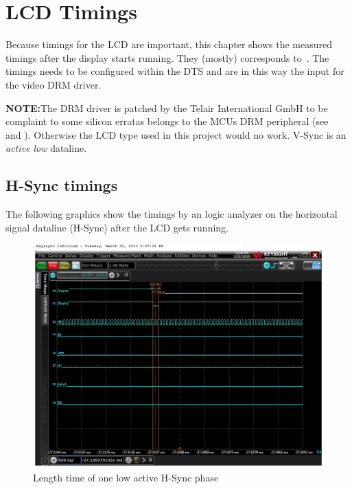 \chapter{LCD Timings}%
\label{cha:lcd_timings}

Because timings for the LCD are important, this chapter shows the measured
timings after the display starts running. They (mostly) corresponds to~\cite[LCD
data sheet]{ortustechlcd}. The timings needs to be configured within
the \gls{DTS} and are in this way the input for the video \gls{DRM} driver.

\textbf{NOTE:}\@ The DRM driver is patched by the Telair International GmbH to
be complaint to some silicon erratas belongs to the MCUs DRM peripheral
(see~\cite{TI_am335x_errata} and ). Otherwise the LCD
type used in this project would no work. V-Sync is an \textit{active low}
dataline.

\newpage
\section{H-Sync timings}%
\label{sub:sync_timings}

The following graphics show the timings by an logic analyzer on the horizontal
signal dataline (H-Sync) after the LCD gets running.
\begin{figure}[h!]
\begin{center}
    \includegraphics[width=14cm]{pictures/lcd_timings/hsync_length.jpg}
\end{center}
\caption{Length time of one low active H-Sync phase}
\label{fig:hsync_active_time}
\end{figure}

